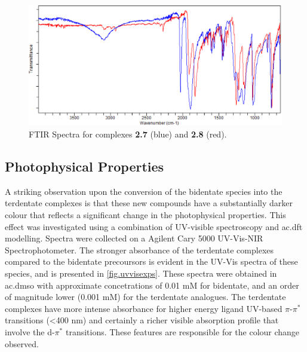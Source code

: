 \begin{figure}[!htb]
 \centering
 \includegraphics[clip=true, width=\textwidth, keepaspectratio]{images/ftir7and8.eps}
 \caption[FTIR Spectra for complexes \textbf{2.7} and \textbf{2.8}]{FTIR Spectra for complexes \textbf{2.7} (blue) and \textbf{2.8} (red).}
 \label{fig.ir78}
\end{figure}

\FloatBarrier
\subsection{Photophysical Properties}

A striking observation upon the conversion of the bidentate species into the terdentate complexes is that these new compounds have a substantially darker colour that reflects a significant change in the photophysical properties. This effect was investigated using a combination of UV-visible spectroscopy and \gls{ac.dft} modelling. Spectra were collected on a Agilent Cary 5000 UV-Vis-NIR Spectrophotometer. The stronger absorbance of the terdentate complexes compared to the bidentate precoursors is evident in the UV-Vis spectra of these species, and is presented in \autoref{fig.uvvisexps}. These spectra were obtained in \gls{ac.dmso} with approximate concetrations of 0.01 mM for bidentate, and an order of magnitude lower (0.001 mM) for the terdentate analogues. The terdentate complexes have more intense absorbance for higher energy ligand UV-based $\pi$-$\pi^\ast$ transitions (\textless 400 nm) and certainly a richer visible absorption profile that involve the d-$\pi^\ast$ transitions. These features are responsible for the colour change observed.


